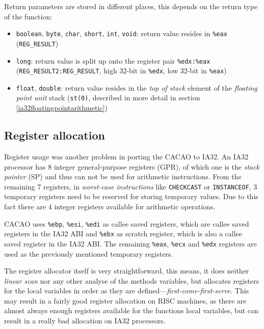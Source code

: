 Return parameters are stored in different places, this depends on the
return type of the function:

\begin{itemize}
 \item \texttt{boolean}, \texttt{byte}, \texttt{char}, \texttt{short},
 \texttt{int}, \texttt{void}: return value resides in \texttt{\%eax}
 (\texttt{REG\_RESULT})

 \item \texttt{long}: return value is split up onto the register pair
 \texttt{\%edx:\%eax}
 (\texttt{REG\_RESULT2:REG\_RESULT}, high 32-bit in
 \texttt{\%edx}, low 32-bit in \texttt{\%eax})

 \item \texttt{float}, \texttt{double}: return value resides in the
 \textit{top of stack} element of the \textit{floating point unit}
 stack (\texttt{st(0)}, described in more detail in section
 \ref{ia32floatingpointarithmetic})
\end{itemize}


\subsection{Register allocation}
\label{sectionia32registerallocation}

Register usage was another problem in porting the CACAO to IA32. An
IA32 processor has 8 integer general-purpose registers (GPR), of which
one is the \textit{stack pointer} (SP) and thus can not be used for
arithmetic instructions. From the remaining 7 registers, in
\textit{worst-case instructions} like \texttt{CHECKCAST} or
\texttt{INSTANCEOF}, 3 temporary registers need to be reserved for
storing temporary values. Due to this fact there are 4 integer
registers available for arithmetic operations.

CACAO uses \texttt{\%ebp}, \texttt{\%esi}, \texttt{\%edi} as callee
saved registers, which are callee saved registers in the IA32 ABI and
\texttt{\%ebx} as scratch register, which is also a callee saved
register in the IA32 ABI. The remaining \texttt{\%eax}, \texttt{\%ecx}
and \texttt{\%edx} registers are used as the previously mentioned
temporary registers.

The register allocator itself is very straightforward, this means, it
does neither \textit{linear scan} nor any other analyse of the methods
variables, but allocates registers for the local variables in order as
they are defined---\textit{first-come-first-serve}. This may result in
a fairly good register allocation on RISC machines, as there are
almost always enough registers available for the functions local
variables, but can result in a really bad allocation on IA32
processors.

